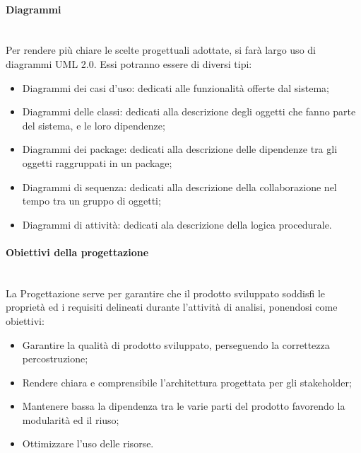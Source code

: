 \paragraph{Diagrammi}\label{Progettazione_Diagrammi}\-\\
Per rendere più chiare le scelte progettuali adottate, si farà largo uso di diagrammi UML 2.0\glossario. Essi potranno essere di diversi tipi:
\begin{itemize}
	\item Diagrammi dei casi d'uso: dedicati alle funzionalità offerte dal sistema;
	\item Diagrammi delle classi: dedicati alla descrizione degli oggetti che fanno parte del sistema, e le loro dipendenze;
	\item Diagrammi dei package: dedicati alla descrizione delle dipendenze tra gli oggetti raggruppati in un package;
	\item Diagrammi di sequenza: dedicati alla descrizione della collaborazione nel tempo tra un gruppo di oggetti;
	\item Diagrammi di attività: dedicati ala descrizione della logica procedurale.
\end{itemize}

\paragraph{Obiettivi della progettazione} \-\\
\label{Progettazione_Obiettivi}
La Progettazione serve per garantire che il prodotto sviluppato soddisfi le proprietà ed i requisiti delineati durante l'attività di analisi, ponendosi come obiettivi:
\begin{itemize}
	\item Garantire la qualità di prodotto sviluppato, perseguendo la correttezza percostruzione;
	\item Rendere chiara e comprensibile l'architettura progettata per gli stakeholder;
	\item Mantenere bassa la dipendenza tra le varie parti del prodotto favorendo la modularità ed il riuso;
	\item Ottimizzare l'uso delle risorse.
\end{itemize}